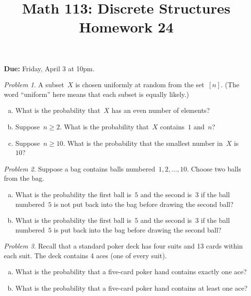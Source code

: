 \documentclass[11pt,twoside]{amsart}
\title{Math 113: Discrete Structures\\ Homework 24}
\theoremstyle{plain}
\theoremstyle{remark}
\newtheorem{prob}{Problem}
\theoremstyle{definition}
\theoremstyle{definition}
\begin{document}
\maketitle

\noindent
\textbf{Due:} Friday, April 3 at 10pm.
\bigskip

\begin{prob}
  A subset~$X$ is chosen uniformly at random from the set~$[n]$. (The word
    ``uniform'' here means that each subset is equally likely.) 
  \begin{enumerate}[(a)]
    \item What is the probability that~$X$ has an even number of
      elements?
    \item Suppose~$n\geq2$.  What is the probability that~$X$ contains~$1$ and~$n$?
    \item Suppose~$n\geq10$.  What is the probability that the smallest number in~$X$ is~$10$?
  \end{enumerate}
\end{prob}

\begin{prob}
  Suppose a bag contains balls numbered~$1,2,\dots,10$.  Choose two balls from
  the bag.
  \begin{enumerate}[(a)]
    \item What is the probability the first ball is~$5$ and the second
      is~$3$ if the ball numbered~$5$ is not put back into the bag before
      drawing the second ball?
    \item What is the probability the first ball is~$5$ and the second
      is~$3$ if the ball numbered~$5$ is put back into the bag before
      drawing the second ball?
  \end{enumerate}
\end{prob}

\begin{prob} Recall that a standard poker deck has four suits and 13 cards within each suit. The deck contains 4 aces (one of every suit).
   \begin{enumerate}[(a)]
     \item What is the probability that a five-card poker hand contains exactly
       one ace?
     \item What is the probability that a five-card poker hand contains at least
       one ace?
   \end{enumerate}
\end{prob}
\end{document}
